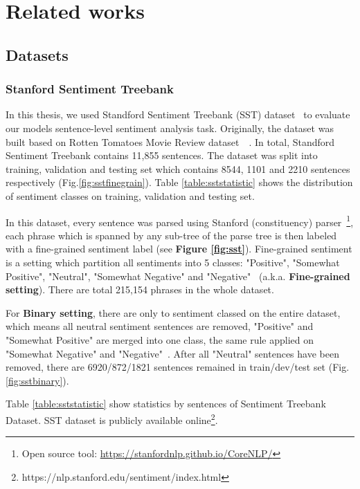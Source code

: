 \hypertarget{chap:related}{\chapter{Related works}}
\label{chap:related-work}
\section{Datasets}\label{sec:dataset}
\subsection{Stanford Sentiment Treebank} \label{sec:sst}
In this thesis, we used Standford Sentiment Treebank (SST) dataset~\cite{socher2013recursive} to evaluate our models sentence-level sentiment analysis task.
Originally, the dataset was built based on Rotten Tomatoes Movie Review dataset~\cite{Rotten-Tomato}~\cite{socher2013recursive}.
In total, Standford Sentiment Treebank contains 11,855 sentences.
The dataset was split into training, validation and testing set which contains 8544, 1101 and 2210 sentences respectively (Fig.\ref{fig:sstfinegrain}).
Table \ref{table:sststatistic} shows the distribution of sentiment classes on training, validation and testing set.

In this dataset, every sentence was parsed using Stanford (constituency) parser~\cite{socher2013recursive}\footnote{Open source tool: \url{https://stanfordnlp.github.io/CoreNLP/}}, each phrase which is spanned by any sub-tree of the parse tree is then labeled with  a fine-grained sentiment label (see \textbf{Figure \ref{fig:sst}}).
Fine-grained sentiment is a setting which partition all sentiments into 5 classes: "Positive", "Somewhat Positive", "Neutral", "Somewhat Negative" and "Negative"~\cite{socher2013recursive} (a.k.a. \textbf{Fine-grained setting}).
There are total 215,154 phrases in the whole dataset.

For \textbf{Binary setting}, there are only to sentiment classed on the entire dataset, which means all neutral sentiment sentences are removed, "Positive" and "Somewhat Positive" are merged into one class, the same rule applied on "Somewhat Negative" and "Negative"~\cite{socher2013recursive}.
After all "Neutral" sentences have been removed, there are 6920/872/1821 sentences remained in train/dev/test set (Fig. \ref{fig:sstbinary}).


Table \ref{table:sststatistic} show statistics by sentences of Sentiment Treebank Dataset.
SST dataset is publicly available online\footnote{https://nlp.stanford.edu/sentiment/index.html}.

